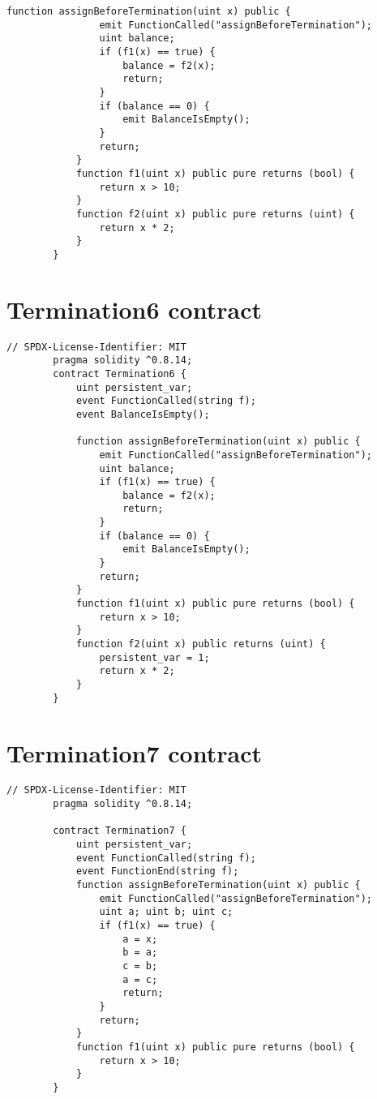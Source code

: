 \documentclass[12pt]{report}
\begin{document}
\begin{appendices}
\begin{lstlisting}[language=Solidity]
            function assignBeforeTermination(uint x) public {
                emit FunctionCalled("assignBeforeTermination");
                uint balance;
                if (f1(x) == true) {
                    balance = f2(x);
                    return;
                }
                if (balance == 0) {
                    emit BalanceIsEmpty();
                }
                return;
            }
            function f1(uint x) public pure returns (bool) {
                return x > 10;
            }
            function f2(uint x) public pure returns (uint) {
                return x * 2;
            }
        }        
    \end{lstlisting}

    \chapter{Termination6 contract}
    \begin{lstlisting}[language=Solidity]
        // SPDX-License-Identifier: MIT
        pragma solidity ^0.8.14;
        contract Termination6 {
            uint persistent_var;
            event FunctionCalled(string f);
            event BalanceIsEmpty();
        
            function assignBeforeTermination(uint x) public {
                emit FunctionCalled("assignBeforeTermination");
                uint balance;
                if (f1(x) == true) {
                    balance = f2(x);
                    return;
                }
                if (balance == 0) {
                    emit BalanceIsEmpty();
                }
                return;
            }
            function f1(uint x) public pure returns (bool) {
                return x > 10;
            }
            function f2(uint x) public returns (uint) {
                persistent_var = 1;
                return x * 2;
            }
        }                   
    \end{lstlisting}

    \chapter{Termination7 contract}
    \begin{lstlisting}[language=Solidity]
        // SPDX-License-Identifier: MIT
        pragma solidity ^0.8.14;

        contract Termination7 {
            uint persistent_var;
            event FunctionCalled(string f);
            event FunctionEnd(string f);
            function assignBeforeTermination(uint x) public {
                emit FunctionCalled("assignBeforeTermination");
                uint a; uint b; uint c;
                if (f1(x) == true) {
                    a = x;
                    b = a;
                    c = b;
                    a = c;
                    return;
                }
                return;
            }
            function f1(uint x) public pure returns (bool) {
                return x > 10;
            }
        }                  
    \end{lstlisting}
    \end{appendices}
\end{document}

